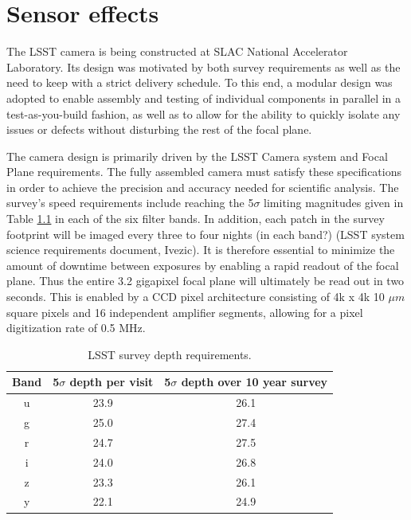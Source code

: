 \chapter{Sensor effects}

The LSST camera is being constructed at SLAC National Accelerator Laboratory. Its design was motivated by both survey requirements as well as the need to keep with a strict delivery schedule. To this end, a modular design was adopted to enable assembly and testing of individual components in parallel in a test-as-you-build fashion, as well as to allow for the ability to quickly isolate any issues or defects without disturbing the rest of the focal plane.

The camera design is primarily driven by the LSST Camera system and Focal Plane requirements. The fully assembled camera must satisfy these specifications in order to achieve the precision and accuracy needed for scientific analysis. The survey's speed requirements include reaching the 5$\sigma$ limiting magnitudes given in Table \ref{tab:5sigma} in each of the six filter bands. In addition, each patch in the survey footprint will be imaged every three to four nights (in each band?) (LSST system science requirements document, Ivezic). It is therefore essential to minimize the amount of downtime between exposures by enabling a rapid readout of the focal plane. Thus the entire 3.2 gigapixel focal plane will ultimately be read out in two seconds. This is enabled by a CCD pixel architecture consisting of 4k x 4k 10 $\mu m$ square pixels and 16 independent amplifier segments, allowing for a pixel digitization rate of 0.5 MHz.

\begin{table}
\caption{LSST survey depth requirements.}
\label{tab:5sigma}
\centering
\begin{tabular}{|c|c|c|}
  \hline
  Band & 5$\sigma$ depth per visit & 5$\sigma$ depth over 10 year survey\\
  \hline \hline
  u & 23.9 & 26.1 \\
  \hline
  g & 25.0 & 27.4 \\
  \hline
  r & 24.7 & 27.5 \\
  \hline
  i & 24.0 & 26.8 \\
  \hline
  z & 23.3 & 26.1 \\
  \hline
  y & 22.1 & 24.9 \\
  \hline
\end{tabular}
\end{table}\\


